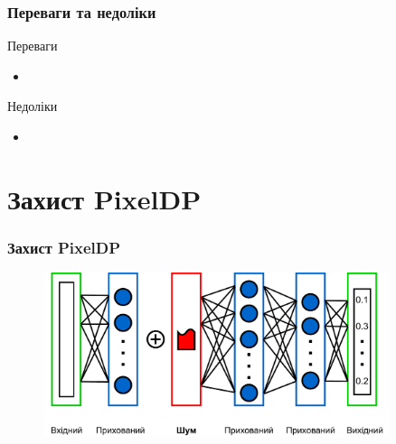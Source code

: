 \documentclass{beamer}
\numberwithin{equation}{section}
\begin{document}
	\begin{frame}
		\frametitle{Переваги та недоліки}
		\begin{block}{Переваги}
			\begin{itemize}
				\item 
			\end{itemize}
		\end{block}
	
		\begin{block}{Недоліки}
			\begin{itemize}
				\item 
			\end{itemize}
		\end{block}
	\end{frame}
	
	
	\section{Захист PixelDP}
	\begin{frame}
		\frametitle{Захист PixelDP}
		
		\begin{figure}[h]
			\centering
			\includegraphics[width=0.9\textwidth]{../images/diagrams-PixelDP-small-p.pdf}
			
		\end{figure}
	\end{frame}
\end{document}
